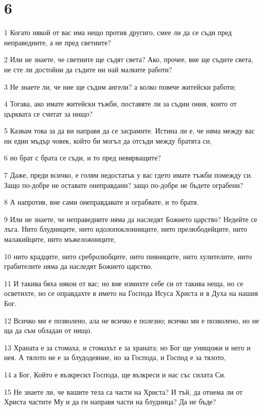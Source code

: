 \chapter{6}

\par 1 Когато някой от вас има нещо против другиго, смее ли да се съди пред неправедните, а не пред светиите?
\par 2 Или не знаете, че светиите ще съдят света? Ако, прочее, вие ще съдите света, не сте ли достойни да съдите ни най малките работи?
\par 3 Не знаете ли, че ние ще съдим ангели? а колко повече житейски работи;
\par 4 Тогава, ако имате житейски тъжби, поставяте ли за съдии ония, които от църквата се считат за нищо?
\par 5 Казвам това за да ви направя да се засрамите. Истина ли е, че няма между вас ни един мъдър човек, който би могъл да отсъди между братята си,
\par 6 но брат с брата се съди, и то пред невярващите?
\par 7 Даже, преди всичко, е голям недостатък у вас гдето имате тъжби помежду си. Защо по-добре не оставате онеправдани? защо по-добре не бъдете ограбени?
\par 8 А напротив, вие сами онеправдавате и ограбвате, и то братя.
\par 9 Или не знаете, че неправедните няма да наследят Божието царство? Недейте се лъга. Нито блудниците, нито идолопоклонниците, нито прелюбодейците, нито малакийците, нито мъжеложниците,
\par 10 нито крадците, нито сребролюбците, нито пияниците, нито хулителите, нито грабителите няма да наследят Божието царство.
\par 11 И такива бяха някои от вас; но вие измихте себе си от такива неща, но се осветихте, но се оправдахте в името на Господа Исуса Христа и в Духа на нашия Бог.
\par 12 Всичко ми е позволено, ала не всичко е полезно; всичко ми е позволено, но не ща да съм обладан от нищо.
\par 13 Храната е за стомаха, и стомахът е за храната; но Бог ще унищожи и него и нея. А тялото не е за блудодеяние, но за Господа, и Господ е за тялото,
\par 14 а Бог, Който е възкресил Господа, ще възкреси и нас със силата Си.
\par 15 Не знаете ли, че вашите тела са части на Христа? И тъй, да отнема ли от Христа частите Му и да ги направя части на блудница? Да не бъде?
